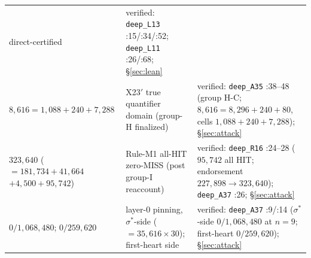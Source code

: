 \begin{longtable}{p{4.9cm} p{6.1cm} p{3.8cm}}
  direct-certified & verified: \texttt{deep\_L13} :15/:34/:52;
  \texttt{deep\_L11} :26/:68; \S\ref{sec:lean} \\
$8{,}616=1{,}088+240+7{,}288$ & X23$'$ true quantifier domain (group-H finalized) &
  verified: \texttt{deep\_A35} :38--48 (group H-C; $8{,}616=8{,}296+240+80$,
  cells $1{,}088+240+7{,}288$); \S\ref{sec:attack} \\
$323{,}640$ ($=181{,}734+41{,}664$ $+4{,}500+95{,}742$) & Rule-M1 all-HIT zero-MISS (post
  group-I reaccount) & verified: \texttt{deep\_R16} :24--28 ($95{,}742$ all HIT;
  endorsement $227{,}898\to323{,}640$); \texttt{deep\_A37} :26; \S\ref{sec:attack} \\
$0/1{,}068{,}480$; $0/259{,}620$ & layer-0 pinning, $\sigma^*$-side
  ($=35{,}616\times30$); first-heart side & verified: \texttt{deep\_A37} :9/:14
  ($\sigma^*$-side $0/1{,}068{,}480$ at $n{=}9$; first-heart $0/259{,}620$); \S\ref{sec:attack} \\
\hline
\end{longtable}
